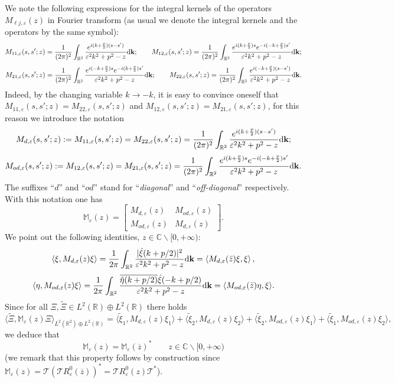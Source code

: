\documentclass[a4paper,11pt,reqno]{amsart}
\theoremstyle{definition}
\numberwithin{equation}{section}
\newcommand{\CO}{\mathbb C}
\newcommand{\RE}{\mathbb R}
\newcommand{\Mb}{\mathbb M}
\newcommand{\Tau}{\mathcal{T}}
\newcommand{\ve}{\varepsilon}
\newcommand{\dk}{\mathrm{d}{\bf k}}
\begin{document}
We note the following expressions for  the integral kernels of the  operators $M_{\ell j,\ve}(z)$ in Fourier transform  (as usual we denote the integral kernels and the operators by the same symbol):
\[
M_{11,\ve}( s, s'; z)  =   \frac{1}{(2\pi)^2}  \int_{\RE^2} \frac{  e^{i (k + \frac{p}2) (s-s')} }{\ve^2 k^2 +p^2  - z}   \dk ; 
\qquad 
M_{12, \ve}( s, s'; z)  =   \frac{1}{(2\pi)^2}  \int_{\RE^2} \frac{e^{i (k + \frac{p}2) s}  e^{-i (-k + \frac{p}2) s'} }{\ve^2 k^2 +p^2  - z}   \dk ;
\]
\[
M_{21,\ve}( s, s'; z)  =   \frac{1}{(2\pi)^2}  \int_{\RE^2} \frac{e^{i (-k + \frac{p}2) s} e^{-i (k + \frac{p}2) s'} }{\ve^2 k^2 +p^2  - z}   \dk ; 
\qquad 
M_{22,\ve}( s, s'; z)  =   \frac{1}{(2\pi)^2}  \int_{\RE^2} \frac{ e^{i (-k + \frac{p}2) (s-s')} }{\ve^2 k^2 +p^2  - z}   \dk . 
\]
Indeed, by the changing variable $k \to -k$, it is easy to convince oneself that  $M_{11,\ve}( s, s'; z)  = M_{22,\ve}( s, s'; z)  $ and $M_{12, \ve}( s, s'; z)  =M_{21,\ve}( s, s'; z)$,  for this reason we introduce the notation 
\[
M_{d,\ve}( s, s'; z) := M_{11,\ve}( s, s'; z) = M_{22,\ve}( s, s'; z)  =   \frac{1}{(2\pi)^2}  \int_{\RE^2} \frac{  e^{i (k + \frac{p}2) (s-s')} }{\ve^2 k^2 +p^2  - z}   \dk ; 
\]
\[
M_{od,\ve} ( s, s'; z) := M_{12, \ve}( s, s'; z)  =M_{21,\ve}( s, s'; z)    =   \frac{1}{(2\pi)^2}  \int_{\RE^2} \frac{e^{i (k + \frac{p}2) s}  e^{-i (-k + \frac{p}2) s'} }{\ve^2 k^2 +p^2  - z}   \dk .
\]
The suffixes ``$d$'' and ``$od$'' stand for ``{\it diagonal}'' and ``{\it off-diagonal}'' respectively. With this notation one has 
\[
\Mb_{\ve}(z)   =	\begin{bmatrix}
			M_{d,\ve}(z) & M_{od,\ve}(z)\\ 
			M_{od,\ve}(z) &M_{d,\ve}(z)
			\end{bmatrix}.
\]
We point out the following identities, $z\in\CO\backslash[0,+\infty)$:  
\begin{equation}\label{Md_eq1}
\langle\xi, M_{d,\ve}(z) \xi\rangle =  \frac{1}{2\pi}  \int_{\RE^2} \frac{  |\hat \xi (k+p/2)|^2}{\ve^2 k^2 +p^2  -z}   \dk  =\langle M_{d,\ve}(\bar z)\xi,\xi\rangle \,,
\end{equation}
\begin{equation}\label{Mod_eq1}
\langle\eta, M_{od,\ve}(z) \xi\rangle =   \frac{1}{2\pi}  \int_{\RE^2} \frac{  \overline{\hat \eta (k+p/2)} \hat \xi (-k+p/2) }{\ve^2 k^2 +p^2  -z }   \dk 
=\langle M_{od,\ve}(\bar z)\eta, \xi\rangle . 
\end{equation}
Since for all $\Xi,\widetilde \Xi \in L^2(\RE)\oplus L^2(\RE)$ there holds 
\begin{equation}\label{3.13a}
\langle\widetilde \Xi, \Mb_{\ve}(z)\Xi\rangle_{L^2(\RE^2)\oplus L^2(\RE)} = \langle\tilde \xi_1, M_{d,\ve}(z) \xi_1\rangle+\langle\tilde \xi_2, M_{d,\ve}(z) \xi_2\rangle + 
\langle\tilde \xi_2,  M_{od,\ve}(z)\xi_1\rangle+ \langle\tilde \xi_1,  M_{od,\ve}(z)\xi_2\rangle, 
\end{equation}
we deduce that 
\begin{equation}\label{Mb_prop1}
\Mb_{\ve}(z) = \Mb_{\ve}(\overline z)^* \qquad z\in\CO\backslash [0,+\infty)
\end{equation}
(we remark that this property follows by construction since $\Mb_{\ve}(z)  =  \Tau (\Tau R^{0}_{\ve}(\overline z))^* =   \Tau  R^{0}_{\ve} (z) \Tau^*$).
\end{document}
